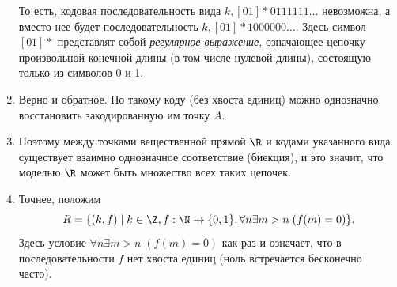 \begin{enumerate}
То есть, кодовая последовательность вида $k,[01]*0111111\dots$ невозможна, а вместо нее будет последовательность $k,[01]*1000000\dots$. Здесь символ $[01]*$ представлят собой \textit{регулярное выражение}, означающее цепочку произвольной конечной длины (в том числе нулевой длины), состоящую только из символов 0 и 1.
\item Верно и обратное. По такому коду (без хвоста единиц) можно однозначно восстановить закодированную им точку $A$.
\item Поэтому между точками вещественной прямой $\R$ и кодами указанного вида существует взаимно однозначное соответствие (биекция), и это значит, что моделью $\R$ может быть множество всех таких цепочек.
\item Точнее, положим
$$
R=\{(k,f)\mid k\in\Z, f:\N\to\{0,1\}, \forall n\exists m>n\;(f(m)=0)\}.
$$
Здесь условие $\forall n\exists m>n\;(f(m)=0)$ как раз и означает, что в последовательности $f$ нет хвоста единиц (ноль встречается бесконечно часто).


\end{enumerate}

